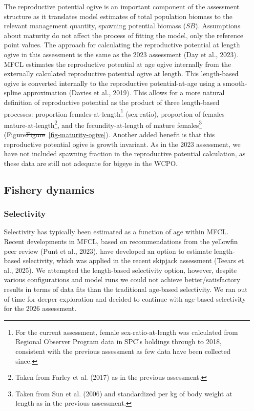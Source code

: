 \documentclass[
  english,
  a4paper,
  a4paper,
  11pt]{SCreport}
\providecommand{\DIFdel}[1]{{\protect\color{red}\sout{#1}}}                      %
\providecommand{\DIFdelbegin}{} %
\providecommand{\DIFdelend}{} %
\newcommand{\DIFscaledelfig}{0.5}
\newlength{\DIFdelgraphicswidth} %
\newlength{\DIFdelgraphicsheight} %
\newcommand{\DIFdelincludegraphics}[2][]{%
\sbox{\DIFdelgraphicsbox}{\DIFOincludegraphics[#1]{#2}}%
\settoboxwidth{\DIFdelgraphicswidth}{\DIFdelgraphicsbox} %
\settoboxtotalheight{\DIFdelgraphicsheight}{\DIFdelgraphicsbox} %
\scalebox{\DIFscaledelfig}{%
\parbox[b]{\DIFdelgraphicswidth}{\usebox{\DIFdelgraphicsbox}\\[-\baselineskip] \rule{\DIFdelgraphicswidth}{0em}}\llap{\resizebox{\DIFdelgraphicswidth}{\DIFdelgraphicsheight}{%
\setlength{\unitlength}{\DIFdelgraphicswidth}%
\begin{picture}(1,1)%
\thicklines\linethickness{2pt} %
{\color[rgb]{1,0,0}\put(0,0){\framebox(1,1){}}}%
{\color[rgb]{1,0,0}\put(0,0){\line( 1,1){1}}}%
{\color[rgb]{1,0,0}\put(0,1){\line(1,-1){1}}}%
\end{picture}%
}\hspace*{3pt}}} %
} %
\DeclareRobustCommand{\DIFdelbegin}{\DIFOdelbegin \let\includegraphics\DIFdelincludegraphics} %
\DeclareRobustCommand{\DIFdelend}{\DIFOaddend \let\includegraphics\DIFOincludegraphics} %
\begin{document}
The reproductive potential ogive is an important component of the
assessment structure as it translates model estimates of total
population biomass to the relevant management quantity, spawning
potential biomass (\(SB\)). Assumptions about maturity do not affect the
process of fitting the model, only the reference point values. The
approach for calculating the reproductive potential at length ogive in
this assessment is the same as the 2023 assessment (Day et al., 2023).
MFCL estimates the reproductive potential at age ogive internally from
the externally calculated reproductive potential ogive at length. This
length-based ogive is converted internally to the reproductive
potential-at-age using a smooth-spline approximation (Davies et al.,
2019). This allows for a more natural definition of reproductive
potential as the product of three length-based processes: proportion
females-at-length\footnote{For the current assessment, female
  sex-ratio-at-length was calculated from Regional Observer Program data
  in SPC's holdings through to 2018, consistent with the previous
  assessment as few data have been collected since.} (sex-ratio),
proportion of females mature-at-length\footnote{Taken from Farley et al.
  (2017) as in the previous assessment.}, and the fecundity-at-length of
mature females\footnote{Taken from Sun et al. (2006) and standardized
  per kg of body weight at length as in the previous assessment.}
(Figure\DIFdelbegin \DIFdel{Figure}\DIFdelend ~\ref{fig-maturity-ogive}). Another added benefit is that this
reproductive potential ogive is growth invariant. As in the 2023
assessment, we have not included spawning fraction in the reproductive
potential calculation, as these data are still not adequate for bigeye
in the WCPO.

\subsection{Fishery dynamics}\label{sec-model-fihsery-dynamics}

\subsubsection{Selectivity}\label{sec-model-selectivity}

Selectivity has typically been estimated as a function of age within
MFCL. Recent developments in MFCL, based on recommendations from the
yellowfin peer review (Punt et al., 2023), have developed an option to
estimate length-based selectivity, which was applied in the recent
skipjack assessment (Teears et al., 2025). We attempted the length-based
selectivity option, however, despite various configurations and model
runs we could not achieve better/satisfactory results in terms of data
fits than the traditional age-based selectivity. We ran out of time for
deeper exploration and decided to continue with age-based selectivity
for the 2026 assessment.
\end{document}
